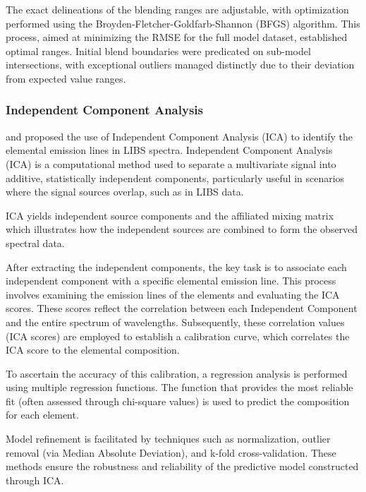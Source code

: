 The exact delineations of the blending ranges are adjustable, with optimization performed using the Broyden-Fletcher-Goldfarb-Shannon (BFGS) algorithm. This process, aimed at minimizing the RMSE for the full model dataset, established optimal ranges. Initial blend boundaries were predicated on sub-model intersections, with exceptional outliers managed distinctly due to their deviation from expected value ranges.

\subsubsection{Independent Component Analysis}\label{sec:ica}
\citet{cleggRecalibrationMarsScience2017} and \cite{forniIndependentComponentAnalysis2013} proposed the use of Independent Component Analysis (ICA) to identify the elemental emission lines in LIBS spectra. Independent Component Analysis (ICA) is a computational method used to separate a multivariate signal into additive, statistically independent components, particularly useful in scenarios where the signal sources overlap, such as in LIBS data.

ICA yields independent source components and the affiliated mixing matrix which illustrates how the independent sources are combined to form the observed spectral data.

After extracting the independent components, the key task is to associate each independent component with a specific elemental emission line. 
This process involves examining the emission lines of the elements and evaluating the ICA scores. 
These scores reflect the correlation between each Independent Component and the entire spectrum of wavelengths. 
Subsequently, these correlation values (ICA scores) are employed to establish a calibration curve, which correlates the ICA score to the elemental composition.

To ascertain the accuracy of this calibration, a regression analysis is performed using multiple regression functions. The function that provides the most reliable fit (often assessed through chi-square values) is used to predict the composition for each element.

Model refinement is facilitated by techniques such as normalization, outlier removal (via Median Absolute Deviation), and k-fold cross-validation. These methods ensure the robustness and reliability of the predictive model constructed through ICA.

